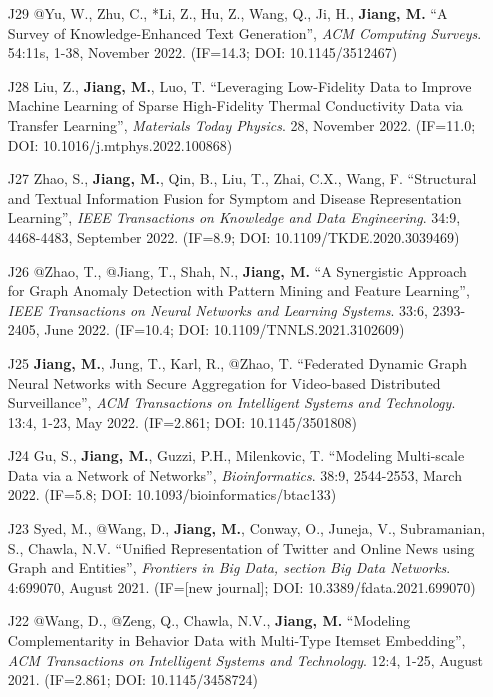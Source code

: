 \documentclass[10pt]{article}
\newenvironment{myindentpar}[1]%
{\begin{list}{}%
         {\setlength{\leftmargin}{#1}}%
         \item[]%
}
{\end{list}}
\newcounter{list}
\begin{document}
\begin{myindentpar}{0.00cm}
\begin{enumerate}[leftmargin=.5cm]
\item[J29] @Yu, W., Zhu, C., *Li, Z., Hu, Z., Wang, Q., Ji, H., \textbf{Jiang, M.} ``A Survey of Knowledge-Enhanced Text Generation'', \textit{ACM Computing Surveys}. 54:11s, 1-38, November 2022. (IF=14.3; DOI: 10.1145/3512467)

\item[J28] Liu, Z., \textbf{Jiang, M.}, Luo, T. ``Leveraging Low-Fidelity Data to Improve Machine Learning of Sparse High-Fidelity Thermal Conductivity Data via Transfer Learning'', \textit{Materials Today Physics}. 28, November 2022. (IF=11.0; DOI: 10.1016/j.mtphys.2022.100868)
	
\item[J27] Zhao, S., \textbf{Jiang, M.}, Qin, B., Liu, T., Zhai, C.X., Wang, F. ``Structural and Textual Information Fusion for Symptom and Disease Representation Learning'', \textit{IEEE Transactions on Knowledge and Data Engineering}. 34:9, 4468-4483, September 2022. (IF=8.9; DOI: 10.1109/TKDE.2020.3039469)

\item[J26] @Zhao, T., @Jiang, T., Shah, N., \textbf{Jiang, M.} ``A Synergistic Approach for Graph Anomaly Detection with Pattern Mining and Feature Learning'', \textit{IEEE Transactions on Neural Networks and Learning Systems}. 33:6, 2393-2405, June 2022. (IF=10.4; DOI: 10.1109/TNNLS.2021.3102609)

\item[J25] \textbf{Jiang, M.}, Jung, T., Karl, R., @Zhao, T. ``Federated Dynamic Graph Neural Networks with Secure Aggregation for Video-based Distributed Surveillance'', \textit{ACM Transactions on Intelligent Systems and Technology}. 13:4, 1-23, May 2022. (IF=2.861; DOI: 10.1145/3501808)

\item[J24] Gu, S., \textbf{Jiang, M.}, Guzzi, P.H., Milenkovic, T. ``Modeling Multi-scale Data via a Network of Networks'', \textit{Bioinformatics}. 38:9, 2544-2553, March 2022. (IF=5.8; DOI: 10.1093/bioinformatics/btac133)

\item[J23] Syed, M., @Wang, D., \textbf{Jiang, M.}, Conway, O., Juneja, V., Subramanian, S., Chawla, N.V. ``Unified Representation of Twitter and Online News using Graph and Entities'', \textit{Frontiers in Big Data, section Big Data Networks}. 4:699070, August 2021. (IF=[new journal]; DOI: 10.3389/fdata.2021.699070)

\item[J22] @Wang, D., @Zeng, Q., Chawla, N.V., \textbf{Jiang, M.} ``Modeling Complementarity in Behavior Data with Multi-Type Itemset Embedding'', \textit{ACM Transactions on Intelligent Systems and Technology}. 12:4, 1-25, August 2021. (IF=2.861; DOI: 10.1145/3458724)


\end{enumerate}
\end{myindentpar}
\end{document}
